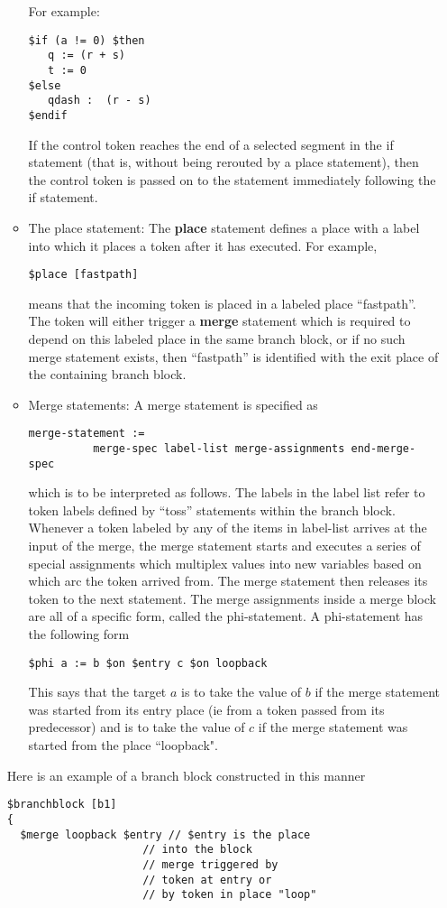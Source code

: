 \documentclass{article}
\begin{document}
\begin{itemize}
\begin{itemize}
\begin{verbatim}
\end{verbatim}
For example:
\begin{verbatim}
$if (a != 0) $then
   q := (r + s)
   t := 0
$else
   qdash :  (r - s)
$endif
\end{verbatim}
If the control token reaches the end of a selected
segment in the if statement (that is, without being
rerouted by a place statement), then the control
token is passed on to the statement immediately
following the if statement.
\item The place statement: The {\bf place} statement
defines a place with a label  into which it places
a token after it has executed.  For example,
\begin{verbatim}
$place [fastpath]
\end{verbatim}
means that the incoming token is placed in a labeled
place ``fastpath''.  The token will either
trigger a {\bf merge} statement which is required
to depend on this labeled place in the same branch
block, or if no such merge statement
exists, then ``fastpath'' is identified
with the exit place of the  containing branch block.
\item Merge statements: A merge statement is
specified as 
\begin{verbatim}
merge-statement :=
          merge-spec label-list merge-assignments end-merge-spec
\end{verbatim}
which is to be interpreted as follows.  The labels in the label list
refer to token labels defined by ``toss'' statements within the branch block.
Whenever a token labeled by any of the items in label-list arrives
at the input of the merge,
the merge statement starts and executes a series of special assignments
which multiplex values into new variables based on which arc the
token arrived from.  The merge statement then releases its token to
the next statement. 
The merge assignments inside a merge block are all of a specific
form, called the phi-statement.  A phi-statement has the following
form
\begin{verbatim}
$phi a := b $on $entry c $on loopback 
\end{verbatim}
This says that the target $a$ is to take the value of $b$ if
the merge statement was started from its entry place (ie from a
token passed from its predecessor) and is to take the value of $c$
if the merge statement was started from the place ``loopback".
\end{itemize}

Here is an example of a branch block constructed in this manner
\begin{verbatim}
$branchblock [b1] 
{
  $merge loopback $entry // $entry is the place
                     // into the block
                     // merge triggered by
                     // token at entry or
                     // by token in place "loop"



\end{verbatim}
\end{itemize}
\end{document}
